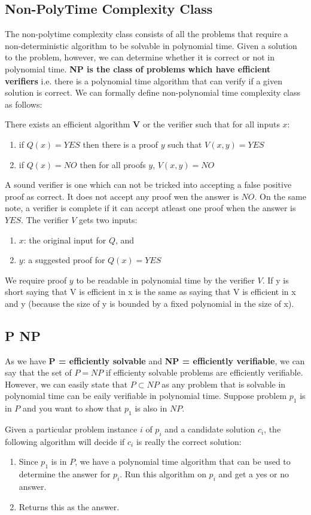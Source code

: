  \subsection{Non-PolyTime Complexity Class}
 The non-polytime complexity class consists of all the problems that require a non-deterministic algorithm to be solvable in polynomial time. Given a solution to the problem, however, we can determine whether it is correct or not in polynomial time. \textbf{NP is the class of problems which have efficient verifiers} i.e. there is a polynomial time algorithm that can verify if a given solution is correct. We can formally define non-polynomial time complexity class as follows:
 
There exists an efficient algorithm $\textbf{V}$ or the verifier such that for all inputs $x$:
\begin{enumerate}
    \item if $Q(x) = YES$ then there is a proof $y$ such that $V(x,y) = YES$
    \item if $Q(x) = NO$ then for all proofs $y$, $V(x,y) = NO$
\end{enumerate}

A sound verifier is one which can not be tricked into accepting a false positive proof as correct. It does not accept any proof wen the answer is $NO$. On the same note, a verifier is complete if it can accept atleast one proof when the answer is $YES$. The verifier $V$ gets two inputs:

\begin{enumerate}
    \item $x$: the original input for $Q$, and
    \item $y$: a suggested proof for $Q(x) = YES$
\end{enumerate}

We require proof $y$ to be readable in polynomial time by the verifier $V$. If y is short saying that V is efficient in x is the same as saying that V is efficient in x and y (because the size of y is bounded by a fixed polynomial in the size of x).

\subsection{P \subset NP}
As we have \textbf{P = efficiently solvable} and \textbf{NP = efficiently verifiable}, we can say that the set of $P = NP$ if efficienty solvable problems are efficiently verifiable. However, we can easily state that $P \subset NP$ as any problem that is solvable in polynomial time can be eaily verifiable in polynomial time. Suppose problem $p_1$ is in $P$ and you want to show that $p_1$ is also in $NP$.

Given a particular problem instance $i$ of $p_i$ and a candidate solution $c_i$, the following algorithm will decide if $c_i$ is really the correct solution:
\begin{enumerate}
    \item Since $p_1$ is in $P$, we have a polynomial time algorithm that can be used to determine the answer for $p_i$. Run this algorithm on $p_i$ and get a yes or no answer.
    \item Returns this as the answer.
\end{enumerate}